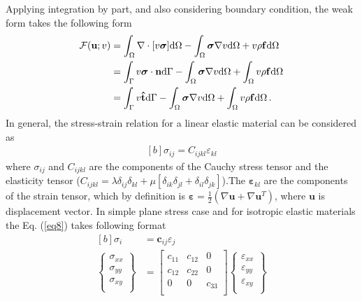 \documentclass[]{article}
\begin{document}
Applying integration by part, and also considering boundary condition, the weak form takes the following form
\begin{equation}\label{eq7}
	\begin{aligned}
		\mathcal{F}(\mathbf{u}; v) &=\int_{\Omega} \nabla \cdot[v\boldsymbol{\sigma}]\mathrm{d}\Omega  - \int_{\Omega} \boldsymbol{\sigma} \nabla v \mathrm{d}\Omega + v \rho \mathbf{f}\mathrm{d}\Omega\\
		 &= \int_{\Gamma} v\boldsymbol{\sigma} \cdot \mathbf{n} \mathrm{d}\Gamma - \int_{\Omega} \boldsymbol{\sigma} \nabla v \mathrm{d}\Omega + \int_{\Omega}v \rho \mathbf{f}\mathrm{d}\Omega\\
		 &=  \int_{\Gamma} v\mathbf{\hat{t}} \mathrm{d}\Gamma - \int_{\Omega} \boldsymbol{\sigma} \nabla v \mathrm{d}\Omega + \int_{\Omega} v \rho \mathbf{f}\mathrm{d}\Omega\thinspace .
	\end{aligned}
\end{equation}
In general, the stress-strain relation for a linear elastic material can be considered as
\begin{equation}\label{eq8}
	\begin{aligned}[b]
		\sigma_{ij} = C_{ijkl} \varepsilon_{kl}
	\end{aligned}
\end{equation}
where $\sigma_{ij}$ and $C_{ijkl}$ are the components of the Cauchy stress tensor and the elasticity tensor ($C_{ijkl} = \lambda\delta_{ij} \delta_{kl} + \mu[\delta_{ik} \delta_{jl} + \delta_{il} \delta_{jk}]$).The  $\boldsymbol{\varepsilon}_{kl}$ are the components of the strain tensor, which by definition is  $\boldsymbol{\varepsilon} = \frac{1}{2}(\nabla \mathbf{u} + \nabla \mathbf{u} ^ T) $, where $\mathbf{u}$ is displacement vector. In simple plane stress case and for isotropic elastic materials the Eq. (\ref{eq8}) takes following format
\begin{equation}\label{eq9}
	\begin{aligned}[b]
		\sigma_{i} &= \mathbf{c}_{ij} \varepsilon_{j}\\
		\begin{Bmatrix}
			\sigma_{xx}\\
			\sigma_{yy}\\
			\sigma_{xy}\\
		\end{Bmatrix}
		&= \begin{bmatrix}
			c_{11} & c_{12} & 0 \\
			c_{12} & c_{22} & 0 \\
			0 & 0 & c_{33} \\
		\end{bmatrix}
		\begin{Bmatrix}
			\varepsilon_{xx}\\
			\varepsilon_{yy}\\
			\varepsilon_{xy}\\
		\end{Bmatrix}
	\end{aligned}
\end{equation}
\end{document}
